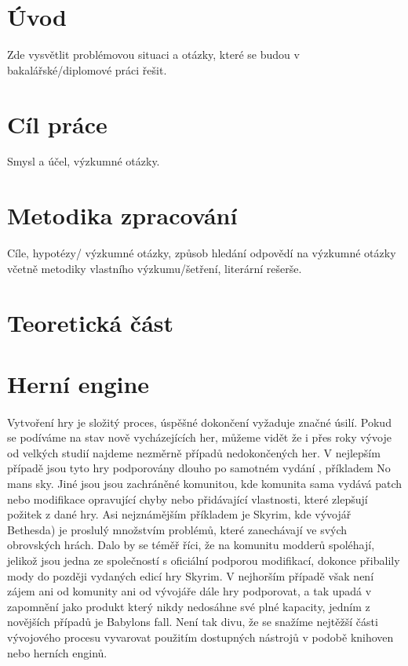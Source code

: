 \section{Úvod}


Zde vysvětlit problémovou situaci a otázky, které se budou v bakalářské/diplomové práci řešit.

\section{Cíl práce}


Smysl a účel, výzkumné otázky.

\section{Metodika zpracování}


Cíle, hypotézy/ výzkumné otázky, způsob hledání odpovědí na výzkumné otázky včetně metodiky vlastního výzkumu/šetření, literární rešerše.


\section{Teoretická část}


\section{Herní engine}
\paragraph{}
	Vytvoření hry je  složitý proces, úspěšné dokončení vyžaduje značné úsilí.
	Pokud se podíváme na stav nově vycházejících her, můžeme vidět že i přes roky vývoje od velkých studií najdeme nezměrně případů nedokončených her.
	V nejlepším případě jsou tyto hry podporovány dlouho po samotném vydání , příkladem No mans sky\cite{no_mans_sky}. 
	Jiné jsou jsou zachráněné komunitou, kde komunita sama vydává patch nebo modifikace opravující chyby nebo přidávající  vlastnosti, které zlepšují požitek z dané hry.
	Asi nejznámějším příkladem je Skyrim\cite{skyrim}, kde vývojář Bethesda\cite{bethesda}) je proslulý množstvím problémů, které zanechávají ve svých obrovských hrách.
	Dalo by se téměř říci, že na komunitu modderů spoléhají, jelikož jsou jedna ze společností s oficiální podporou modifikací, dokonce přibalily mody do později vydaných edicí hry Skyrim.
	V nejhorším případě však není zájem ani od komunity ani od vývojáře dále hry podporovat, a tak upadá v zapomnění jako produkt který nikdy nedosáhne své plné kapacity, jedním z novějších případů je Babylons fall\cite{babylons_fall}.
	Není tak divu, že se snažíme nejtěžší části vývojového procesu vyvarovat použitím dostupných nástrojů v podobě knihoven nebo herních enginů.

